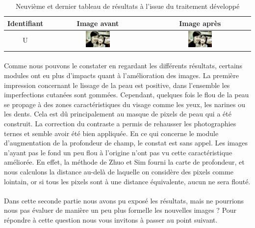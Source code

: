 \documentclass[11pt, french,screen]{report-rd-info}
\begin{document}
\begin{table}
\centering
\begin{tabular}{|c|c|c|}	
   \hline \textbf{Identifiant}  &  \textbf{Image avant}  &  \textbf{Image après}  \\ \hline 
   U & \includegraphics[width=0.25\textwidth]{Resultats/pu_avant} & \includegraphics[width=0.25\textwidth]{Resultats/pu_apres}\\ \hline
\end{tabular}
\caption{Neuvième et dernier tableau de résultats à l'issue du traitement développé}
\label{tab:Resultats9}
\end{table}



\paragraph*{}
Comme nous pouvons le constater en regardant les différents résultats, certains modules ont eu plus d'impacts quant à l'amélioration des images. La première impression concernant le lissage de la peau est positive, dans l'ensemble les imperfections cutanées sont gommées. Cependant, quelques fois le flou de la peau se propage à des zones caractéristiques du visage comme les yeux, les narines ou les dents. Cela est dû principalement au masque de pixels de peau qui a été construit. 
La correction du contraste a permis de rehausser les photographies ternes et semble avoir été bien appliquée.
En ce qui concerne le module d'augmentation de la profondeur de champ, le constat est sans appel. Les images n'ayant pas le fond un peu flou à l'origine n'ont pas vu cette caractéristique améliorée. En effet, la méthode de Zhuo et Sim \cite{Zhuo2011} fourni la carte de profondeur, et nous calculons la distance au-delà de laquelle on considère des pixels comme lointain, or si tous les pixels sont à une distance équivalente, aucun ne sera flouté.

\paragraph*{}
Dans cette seconde partie nous avons pu exposé les résultats, mais ne pourrions nous pas évaluer de manière un peu plus formelle les nouvelles images ? Pour répondre à cette question nous vous invitons à passer au point suivant.
\end{document}
